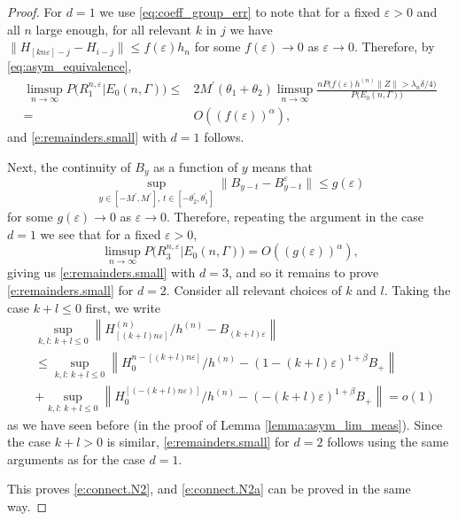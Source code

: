 \documentclass[10pt,a4paper]{amsart}
\newcommand{\eps}{\varepsilon}
\begin{document}
\begin{proof}
For $d=1$ we use \eqref{eq:coeff_group_err} to note that for a fixed
$\eps>0$ and all $n$ large enough, for all relevant $k$ in $j$ we have 
  $\| H_{[kn\eps]-j}-H_{i-j}\| \leq f(\eps) h_n $ for  some $f(\eps)
  \to 0$ as $\eps \to 0$.  Therefore, by \eqref{eq:asym_equivalence}, 
 \begin{align*}
\limsup_{n\to\infty} P\bigl( R_1^{n,
                    \eps}\big|E_0(n,\Gamma)\bigr) 
\leq& 2M^\prime (\theta_1+\theta_2)\limsup_{n\to\infty}  \frac{nP\bigl(f(\eps) h^{(n)} \|Z\|
    > \lambda_n \delta/4\bigr)}{P\bigl( E_0(n,\Gamma)\bigr)} \\
=&O((f(\eps))^\alpha),
  \end{align*}
and   \eqref{e:remainders.small} with $d=1$ follows. 

Next, the continuity of $B_y$ as a function of $y$ means that
$$
\sup_{y\in [-M^\prime,M^\prime], \, t \in [-\theta_2^\prime,
  \theta_1^\prime]} \|B_{y-t} - B_{y - t}^\eps\| \leq g(\eps)
$$
 for some $g(\eps)\to 0$ as $\eps\to 0$. Therefore, repeating the
 argument in the case $d=1$ we see that for a fixed $\eps>0$,
 $$
 \limsup_{n\to\infty} P\bigl( R_3^{n,
                    \eps}\big|E_0(n,\Gamma)\bigr) = O((g(\eps))^\alpha),
                  $$
giving us \eqref{e:remainders.small} with $d=3$, and so it remains to
prove \eqref{e:remainders.small} for $d=2$. Consider all relevant
choices of $k$ and $l$. Taking the case $k+l\leq 0$ first, we write 
\begin{align*}
     & \sup_{k,l:\, k+l\leq 0}\left\|H_{[(k+l)n\eps]}^{(n)}/h^{(n)}-
       B_{(k+l)\eps}\right\| \\
&\leq  \sup_{k,l:\, k+l\leq 0} \left\|H_0^{n-[(k+l)n\eps]} /h^{(n)}- (1-(k+l)\eps)^{1+\beta}B_+ \right\|  \\
     & +  \sup_{k,l:\, k+l\leq 0} \left\|H_0^{[(-(k+l) n\eps)]}/h^{(n)}
     - (-(k+l)\eps)^{1+\beta} B_+ \right\| =   o(1)
\end{align*}
as we have seen before (in the proof of Lemma
\ref{lemma:asym_lim_meas}). Since the case $k+l>0$ is similar, 
 \eqref{e:remainders.small} for $d=2$ follows using the same arguments
 as for the case $d=1$. 

 This proves \eqref{e:connect.N2}, and \eqref{e:connect.N2a} can be
 proved in the same way. 
\end{proof}
\end{document}
